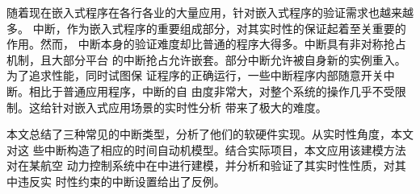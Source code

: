  

\makeatletter
\ifthu@bachelor\relax\else
  \ifthu@doctor
  \else
    \ifthu@master
    \fi
  \fi
\fi
\makeatother





\begin{cabstract}
   随着现在嵌入式程序在各行各业的大量应用，针对嵌入式程序的验证需求也越来越多。
   中断，作为嵌入式程序的重要组成部分，对其实时性的保证起着至关重要的作用。然而，
   中断本身的验证难度却比普通的程序大得多。中断具有非对称抢占机制，且大部分平台
   的中断抢占允许嵌套。部分中断允许被自身新的实例重入。为了追求性能，同时试图保
   证程序的正确运行，一些中断程序内部随意开关中断。相比于普通应用程序，中断的自
   由度非常大，对整个系统的操作几乎不受限制。这给针对嵌入式应用场景的实时性分析
   带来了极大的难度。
   
   本文总结了三种常见的中断类型，分析了他们的软硬件实现。从实时性角度，本文对这
   些中断构造了相应的时间自动机模型。结合实际项目，本文应用该建模方法对在某航空
   动力控制系统中在\uppaal 中进行建模，并分析和验证了其实时性性质，对其中违反实
   时性约束的中断设置给出了反例。
\end{cabstract}


